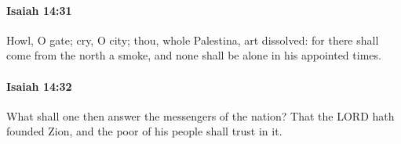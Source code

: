 		\paragraph{Isaiah 14:31} %
			\label{ISAIAH-14-31}

			Howl, O gate; cry, O city; thou, whole Palestina, art dissolved: for there shall come from the north a smoke, and none shall be alone in his appointed times.


		\paragraph{Isaiah 14:32} %
			\label{ISAIAH-14-32}

			What shall one then answer the messengers of the nation? That the LORD hath founded Zion, and the poor of his people shall trust in it.

